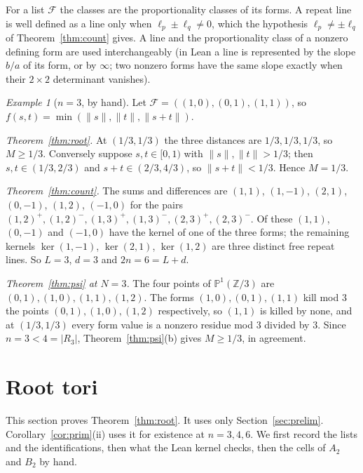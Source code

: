 \documentclass[11pt]{amsart}
\theoremstyle{definition}
\theoremstyle{remark}
\newtheorem{example}[theorem]{Example}
\newcommand{\Z}{\mathbb{Z}}
\newcommand{\dist}[1]{\lVert #1\rVert}
\begin{document}
For a list $\mathcal F$ the classes are the proportionality classes of its forms. A repeat line is well defined as a line only when $\ell_p\pm\ell_q\ne0$, which the hypothesis $\ell_p\ne\pm\ell_q$ of Theorem~\ref{thm:count} gives. A line and the proportionality class of a nonzero defining form are used interchangeably (in Lean a line is represented by the slope $b/a$ of its form, or by $\infty$; two nonzero forms have the same slope exactly when their $2\times2$ determinant vanishes).

\begin{example}[$n=3$, by hand]\label{ex:A2}
Let $\mathcal F=((1,0),(0,1),(1,1))$, so $f(s,t)=\min(\dist s,\dist t,\dist{s+t})$.

\emph{Theorem~\ref{thm:root}.} At $(1/3,1/3)$ the three distances are $1/3,1/3,1/3$, so $M\ge1/3$. Conversely suppose $s,t\in[0,1)$ with $\dist s,\dist t>1/3$; then $s,t\in(1/3,2/3)$ and $s+t\in(2/3,4/3)$, so $\dist{s+t}<1/3$. Hence $M=1/3$.

\emph{Theorem~\ref{thm:count}.} The sums and differences are $(1,1)$, $(1,-1)$, $(2,1)$, $(0,-1)$, $(1,2)$, $(-1,0)$ for the pairs $(1,2)^+,(1,2)^-,(1,3)^+,(1,3)^-,(2,3)^+,(2,3)^-$. Of these $(1,1)$, $(0,-1)$ and $(-1,0)$ have the kernel of one of the three forms; the remaining kernels $\ker(1,-1)$, $\ker(2,1)$, $\ker(1,2)$ are three distinct free repeat lines. So $L=3$, $d=3$ and $2n=6=L+d$.

\emph{Theorem~\ref{thm:psi} at $N=3$.} The four points of $\mathbb P^1(\Z/3)$ are $(0,1),(1,0),(1,1),(1,2)$. The forms $(1,0),(0,1),(1,1)$ kill mod $3$ the points $(0,1),(1,0),(1,2)$ respectively, so $(1,1)$ is killed by none, and at $(1/3,1/3)$ every form value is a nonzero residue mod $3$ divided by $3$. Since $n=3<4=|R_3|$, Theorem~\ref{thm:psi}(b) gives $M\ge1/3$, in agreement.
\end{example}

\section{Root tori}\label{sec:root}

This section proves Theorem~\ref{thm:root}. It uses only Section~\ref{sec:prelim}. Corollary~\ref{cor:prim}(ii) uses it for existence at $n=3,4,6$. We first record the lists and the identifications, then what the Lean kernel checks, then the cells of $A_2$ and $B_2$ by hand.
\end{document}
